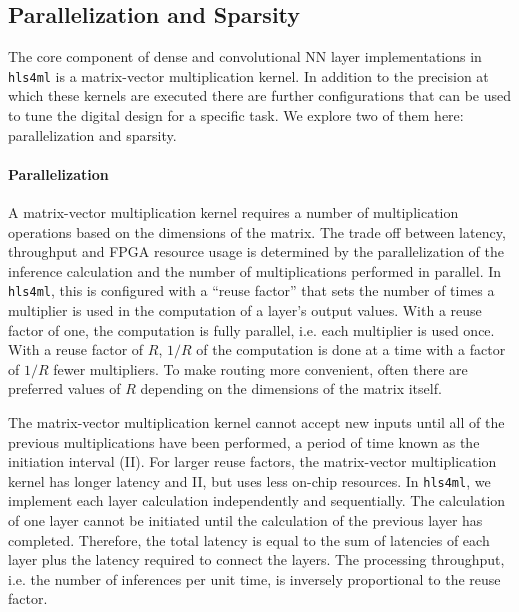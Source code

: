\documentclass[tinyml]{acmart}
\newcommand{\hlsfml}{\texttt{hls4ml}\xspace}
\begin{document}
\subsection{Parallelization and Sparsity}
\label{sec:parallelandsparse}
The core component of dense and convolutional NN layer implementations in \hlsfml is a matrix-vector multiplication kernel.
In addition to the precision at which these kernels are executed there are further configurations that can be used to tune the digital design for a specific task.
We explore two of them here: parallelization and sparsity.

\paragraph{Parallelization}

A matrix-vector multiplication kernel requires a number of multiplication operations based on the dimensions of the matrix.
The trade off between latency, throughput and FPGA resource usage is determined by the parallelization of the inference calculation and the number of multiplications performed in parallel.
In \hlsfml, this is configured with a ``reuse factor'' that sets the number of times a multiplier is used in the computation of a layer's output values.
With a reuse factor of one, the computation is fully parallel, i.e. each multiplier is used once.
With a reuse factor of $R$, $1/R$ of the computation is done at a time with a factor of $1/R$ fewer multipliers.
To make routing more convenient, often there are preferred values of $R$ depending on the dimensions of the matrix itself.

The matrix-vector multiplication kernel cannot accept new inputs until all of the previous multiplications have been performed, a period of time known as the initiation interval (II).
For larger reuse factors, the matrix-vector multiplication kernel has longer latency and II, but uses less on-chip resources.
In \hlsfml, we implement each layer calculation independently and sequentially.
The calculation of one layer cannot be initiated until the calculation of the previous layer has completed.
Therefore, the total latency is equal to the sum of latencies of each layer plus the latency required to connect the layers.
The processing throughput, i.e. the number of inferences per unit time, is inversely proportional to the reuse factor.
\end{document}
